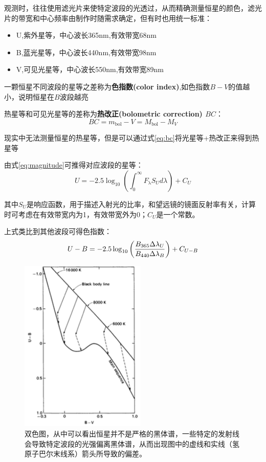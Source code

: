 \documentclass[openany]{ctexbook}
\begin{document}
观测时，往往使用滤光片来使特定波段的光透过，从而精确测量恒星的颜色，滤光片的带宽和中心频率由制作时随需求确定，但有时也用统一标准：
\begin{itemize}
  \item U,紫外星等，中心波长365\;nm,有效带宽68\;nm
  \item B,蓝光星等，中心波长440\;nm,有效带宽98\;nm
  \item V,可见光星等，中心波长550\;nm,有效带宽89\;nm
\end{itemize}

一颗恒星不同波段的星等之差称为{\bf 色指数(color index)},如色指数$B-V$的值越小，说明恒星在$B$波段越亮

热星等和可见光星等的差称为{\bf 热改正(bolometric correction) $BC$}：
\begin{equation}
  BC=m_\mathrm{bol}-V=M_\mathrm{bol}-M_V
  \label{eq:bc}
\end{equation}

现实中无法测量恒星的热星等，但是可以通过式\ref{eq:bc}将光星等+热改正来得到热星等

由式\ref{eq:magnitude}可推得对应波段的星等：
\begin{equation}
  U=-2.5\log_{10}\left(\int_0^\infty F_\mathrm\lambda S_U d\lambda\right)+C_U
\end{equation}

其中$S_U$是响应函数，用于描述入射光的比率，和望远镜的镜面反射率有关，计算时可考虑在有效带宽内为1，有效带宽外为0；$C_U$是一个常数。

上式类比到其他波段可得色指数：
\begin{equation}
  U-B=-2.5\log_{10}\left({B_{365}\Delta\lambda_U \over B_{440}\Delta\lambda_B}\right)+C_{U-B}
\end{equation}

\begin{figure}[hbt]
  \centering
  \includegraphics[width=6cm]{chapters/03/CC}
  \caption{双色图，从中可以看出恒星并不是严格的黑体谱，一些特定的发射线会导致特定波段的光强偏离黑体谱，从而出现图中的虚线和实线（氢原子巴尔末线系）箭头所导致的偏差。}
  \label{fig:cc}
\end{figure}
\end{document}
